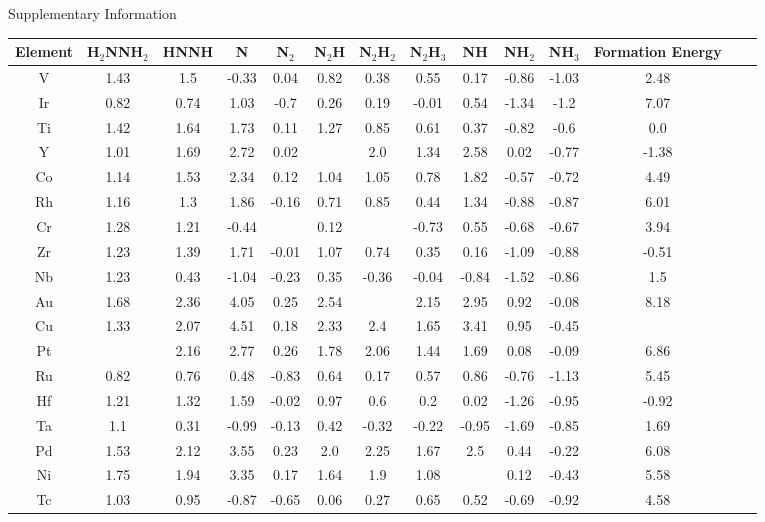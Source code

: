 Supplementary Information
\onecolumn
\begin{center}
\begin{tabular}{| c | c | c | c | c | c | c | c | c | c | c | c | c | c |}
\hline
Element & H$_2$NNH$_2$ & HNNH & N & N$_2$ & N$_2$H & N$_2$H$_2$ & N$_2$H$_3$ & NH & NH$_2$ & NH$_3$ & Formation Energy & \\
\hline

V & 1.43 & 1.5 & -0.33 & 0.04 & 0.82 & 0.38 & 0.55 & 0.17 & -0.86 & -1.03 & 2.48 \\
Ir & 0.82 & 0.74 & 1.03 & -0.7 & 0.26 & 0.19 & -0.01 & 0.54 & -1.34 & -1.2 & 7.07 \\
Ti & 1.42 & 1.64 & 1.73 & 0.11 & 1.27 & 0.85 & 0.61 & 0.37 & -0.82 & -0.6 & 0.0 \\
Y & 1.01 & 1.69 & 2.72 & 0.02 &  & 2.0 & 1.34 & 2.58 & 0.02 & -0.77 & -1.38 \\
Co & 1.14 & 1.53 & 2.34 & 0.12 & 1.04 & 1.05 & 0.78 & 1.82 & -0.57 & -0.72 & 4.49 \\
Rh & 1.16 & 1.3 & 1.86 & -0.16 & 0.71 & 0.85 & 0.44 & 1.34 & -0.88 & -0.87 & 6.01 \\
Cr & 1.28 & 1.21 & -0.44 &  & 0.12 &  & -0.73 & 0.55 & -0.68 & -0.67 & 3.94 \\
Zr & 1.23 & 1.39 & 1.71 & -0.01 & 1.07 & 0.74 & 0.35 & 0.16 & -1.09 & -0.88 & -0.51 \\
Nb & 1.23 & 0.43 & -1.04 & -0.23 & 0.35 & -0.36 & -0.04 & -0.84 & -1.52 & -0.86 & 1.5 \\
Au & 1.68 & 2.36 & 4.05 & 0.25 & 2.54 &  & 2.15 & 2.95 & 0.92 & -0.08 & 8.18 \\
Cu & 1.33 & 2.07 & 4.51 & 0.18 & 2.33 & 2.4 & 1.65 & 3.41 & 0.95 & -0.45 &  \\
Pt &  & 2.16 & 2.77 & 0.26 & 1.78 & 2.06 & 1.44 & 1.69 & 0.08 & -0.09 & 6.86 \\
Ru & 0.82 & 0.76 & 0.48 & -0.83 & 0.64 & 0.17 & 0.57 & 0.86 & -0.76 & -1.13 & 5.45 \\
Hf & 1.21 & 1.32 & 1.59 & -0.02 & 0.97 & 0.6 & 0.2 & 0.02 & -1.26 & -0.95 & -0.92 \\
Ta & 1.1 & 0.31 & -0.99 & -0.13 & 0.42 & -0.32 & -0.22 & -0.95 & -1.69 & -0.85 & 1.69 \\
Pd & 1.53 & 2.12 & 3.55 & 0.23 & 2.0 & 2.25 & 1.67 & 2.5 & 0.44 & -0.22 & 6.08 \\
Ni & 1.75 & 1.94 & 3.35 & 0.17 & 1.64 & 1.9 & 1.08 &  & 0.12 & -0.43 & 5.58 \\
Tc & 1.03 & 0.95 & -0.87 & -0.65 & 0.06 & 0.27 & 0.65 & 0.52 & -0.69 & -0.92 & 4.58 \\

\end{tabular}
\end{center}

